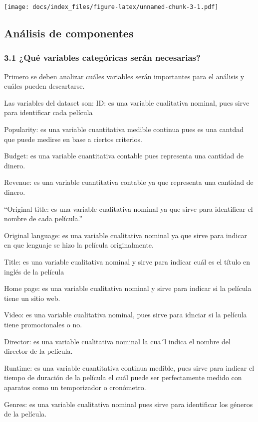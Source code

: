 \documentclass[
]{article}
\begin{document}
\texttt{[image: docs/index\_files/figure-latex/unnamed-chunk-3-1.pdf]}

\subsection{Análisis de componentes}\label{anuxe1lisis-de-componentes}

\subsubsection{3.1 ¿Qué variables categóricas serán
necesarias?}\label{quuxe9-variables-categuxf3ricas-seruxe1n-necesarias}

Primero se deben analizar cuáles variables serán importantes para el
análisis y cuáles pueden descartarse.

Las variables del dataset son: ID: es una variable cualitativa nominal,
pues sirve para identificar cada película

Popularity: es una variable cuantitativa medible continua pues es una
cantdad que puede medirse en base a ciertos criterios.

Budget: es una variable cuantitativa contable pues representa una
cantidad de dinero.

Revenue: es una variable cuantitativa contable ya que representa una
cantidad de dinero.

``Original title: es una variable cualitativa nominal ya que sirve para
identificar el nombre de cada película.''

Original language: es una variable cualitativa nominal ya que sirve para
indicar en que lenguaje se hizo la película originalmente.

Title: es una variable cualitativa nominal y sirve para indicar cuál es
el título en inglés de la película

Home page: es una variable cualitativa nominal y sirve para indicar si
la película tiene un sitio web.

Video: es una variable cualitativa nominal, pues sirve para idnciar si
la película tiene promocionales o no.

Director: es una variable cualitativa nominal la cua´l indica el nombre
del director de la película.

Runtime: es una variable cuantitativa continua medible, pues sirve para
indicar el tiempo de duración de la película el cuál puede ser
perfectamente medido con aparatos como un temporizador o cronómetro.

Genres: es una variable cualitativa nominal pues sirve para identificar
los géneros de la película.
\end{document}
